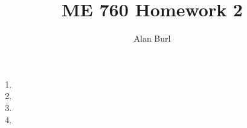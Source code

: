 \documentclass[12pt]{article}
\author{Alan Burl}
\title{ME 760 Homework 2}
\begin{document}
\maketitle
\clearpage
\begin{enumerate}
	\item \clearpage 
	\item \clearpage 
	\item \clearpage
	\item \clearpage 

\end{enumerate}
\clearpage
\end{document}
